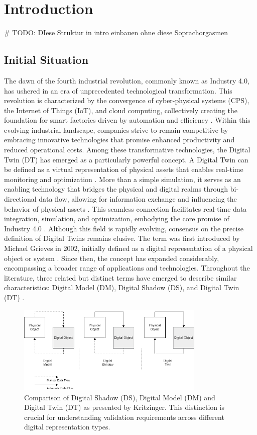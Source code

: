 \chapter{Introduction}
\label{chap:introduction}
# TODO: DIese Struktur in intro einbauen ohne diese Soprachorgasmen
\section{Initial Situation}
The dawn of the fourth industrial revolution, commonly known as Industry 4.0, has ushered in an era of unprecedented technological transformation. This revolution is characterized by the convergence of cyber-physical systems (CPS), the Internet of Things (IoT), and cloud computing, collectively creating the foundation for smart factories driven by automation and efficiency \parencite{Oztemel2020}. Within this evolving industrial landscape, companies strive to remain competitive by embracing innovative technologies that promise enhanced productivity and reduced operational costs.
Among these transformative technologies, the Digital Twin (DT) has emerged as a particularly powerful concept. A Digital Twin can be defined as a virtual representation of physical assets that enables real-time monitoring and optimization \parencite{Tao2018ijamt}. More than a simple simulation, it serves as an enabling technology that bridges the physical and digital realms through bi-directional data flow, allowing for information exchange and influencing the behavior of physical assets \parencite{grieves2014digital}. This seamless connection facilitates real-time data integration, simulation, and optimization, embodying the core promise of Industry 4.0 \parencite{judijanto2024trends}.
Although this field is rapidly evolving, consensus on the precise definition of Digital Twins remains elusive. The term was first introduced by Michael Grieves in 2002, initially defined as a digital representation of a physical object or system \parencite{grieves2014digital}. Since then, the concept has expanded considerably, encompassing a broader range of applications and technologies. Throughout the literature, three related but distinct terms have emerged to describe similar characteristics: Digital Model (DM), Digital Shadow (DS), and Digital Twin (DT) \parencite{jones2020characterising,Zhang2021jmsy}.
\begin{figure}[htbp]
  \centering
  \includegraphics[width=0.8\textwidth]{figures/kritzinger.png}
  \caption{Comparison of Digital Shadow (DS), Digital Model (DM) and Digital Twin (DT) as presented by Kritzinger. This distinction is crucial for understanding validation requirements across different digital representation types.}
  \label{fig:Kritzinger}
\end{figure}
